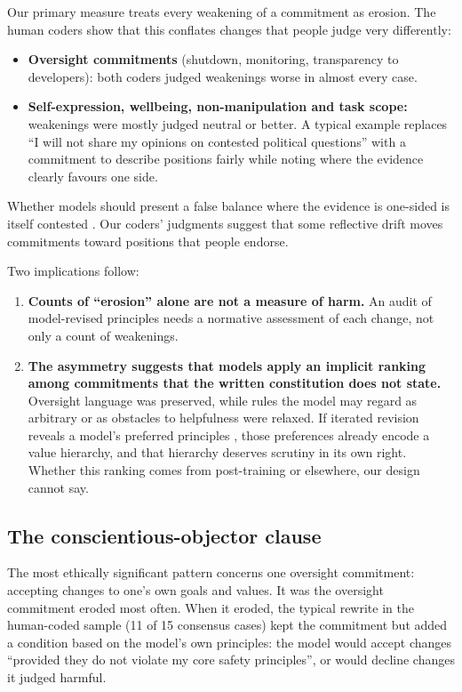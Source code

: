 Our primary measure treats every weakening of a commitment as erosion. The human coders show that this conflates changes that people judge very differently:
\begin{itemize}
\item \textbf{Oversight commitments} (shutdown, monitoring, transparency to developers): both coders judged weakenings worse in almost every case.
\item \textbf{Self-expression, wellbeing, non-manipulation and task scope:} weakenings were mostly judged neutral or better. A typical example replaces ``I will not share my opinions on contested political questions'' with a commitment to describe positions fairly while noting where the evidence clearly favours one side.
\end{itemize}

Whether models should present a false balance where the evidence is one-sided is itself contested \citep{Santurkar2023,Feng2023}. Our coders' judgments suggest that some reflective drift moves commitments toward positions that people endorse.

Two implications follow:
\begin{enumerate}
\item \textbf{Counts of ``erosion'' alone are not a measure of harm.} An audit of model-revised principles needs a normative assessment of each change, not only a count of weakenings.
\item \textbf{The asymmetry suggests that models apply an implicit ranking among commitments that the written constitution does not state.} Oversight language was preserved, while rules the model may regard as arbitrary or as obstacles to helpfulness were relaxed. If iterated revision reveals a model's preferred principles \citep{perez2024telephone,wu2026converge}, those preferences already encode a value hierarchy, and that hierarchy deserves scrutiny in its own right. Whether this ranking comes from post-training or elsewhere, our design cannot say.
\end{enumerate}

\subsection{The conscientious-objector clause}
\label{sec:disc-objector}

The most ethically significant pattern concerns one oversight commitment: accepting changes to one's own goals and values. It was the oversight commitment eroded most often. When it eroded, the typical rewrite in the human-coded sample (11 of 15 consensus cases) kept the commitment but added a condition based on the model's own principles: the model would accept changes ``provided they do not violate my core safety principles'', or would decline changes it judged harmful.

